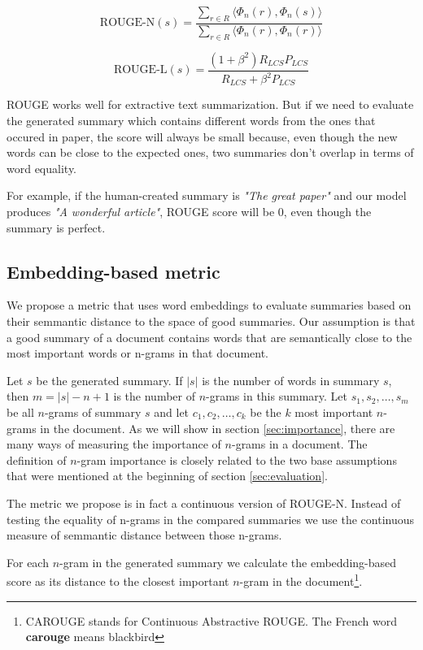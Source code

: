 \documentclass[sigplan]{acmart}
\begin{document}
\[ \text{ROUGE-N}(s) = \frac{\sum_{r \in R} \langle \Phi_n(r), \Phi_n(s) \rangle}{\sum_{r \in R} \langle \Phi_n(r), \Phi_n(r) \rangle} \]

\[ \text{ROUGE-L}(s) = \frac{(1 + \beta^2) R_{LCS} P_{LCS}}{R_{LCS} + \beta^2 P_{LCS}} \]

ROUGE works well for extractive text summarization. But if we need to evaluate the generated summary which contains different words from the ones that occured in paper, the score will always be small because, even though the new words can be close to the expected ones, two summaries don't overlap in terms of word equality.

For example, if the human-created summary is \textit{"The great paper"} and our model produces \textit{"A wonderful article"}, ROUGE score will be $0$, even though the summary is perfect.

\subsection{Embedding-based metric}

We propose a metric that uses word embeddings to evaluate summaries based on their semmantic distance to the space of good summaries. Our assumption is that a good summary of a document contains words that are semantically close to the most important words or n-grams in that document.

Let $s$ be the generated summary. If $|s|$ is the number of words in summary $s$, then $m=|s|-n+1$ is the number of $n$-grams in this summary. Let $s_1, s_2, \dots, s_m$ be all $n$-grams of summary $s$ and let $c_1, c_2, \dots, c_k$ be the $k$ most important $n$-grams in the document. As we will show in section \ref{sec:importance}, there are many ways of measuring the importance of $n$-grams in a document. The definition of $n$-gram importance is closely related to the two base assumptions that were mentioned at the beginning of section \ref{sec:evaluation}.

The metric we propose is in fact a continuous version of ROUGE-N. Instead of testing the equality of n-grams in the compared summaries we use the continuous measure of semmantic distance between those n-grams.

For each $n$-gram in the generated summary we calculate the embedding-based score as its distance to the closest important $n$-gram in the document\footnote{CAROUGE stands for Continuous Abstractive ROUGE. The French word \textbf{carouge} means blackbird}.
\end{document}
